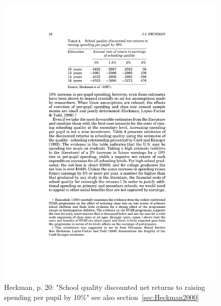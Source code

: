 \documentclass[12pt,a4paper]{article}
\begin{document}
    \begin{figure}[htb]
      \centering
      \includegraphics[width=12cm]{Meeting 10 Policies to foster human capital - Seite 20.pdf}
      \caption{Heckman, p. 20: "School quality discounted net returns to raising spending per pupil by 10\%" see also section~\ref{sec:Heckman2000}}
      \label{fig:Heckman schoolquality}
    \end{figure}
\end{document}
